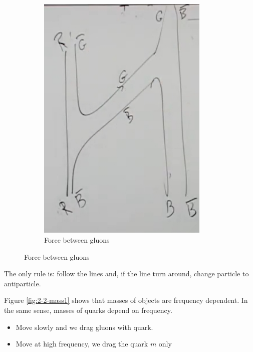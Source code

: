 \documentclass[]{article}
\begin{document}
\begin{figure}[H]
\begin{subfigure}[t]{0.45\textwidth}
	\end{subfigure}
		\begin{subfigure}[t]{0.45\textwidth}
		\caption{Force between gluons}
		\includegraphics[width=0.9\textwidth]{2-2-gluon8}
	\end{subfigure}
\end{figure}

The only rule is: follow the lines and, if the line turn around, change particle to antiparticle.

Figure \ref{fig:2-2-mass1} shows that masses of objects are frequency dependent. In the same sense, masses of quarks depend on frequency.
\begin{itemize}
	\item  Move slowly and we drag gluons with quark.
	\item Move at high frequency, we drag the quark $m$ only
\end{itemize}
\end{document}
